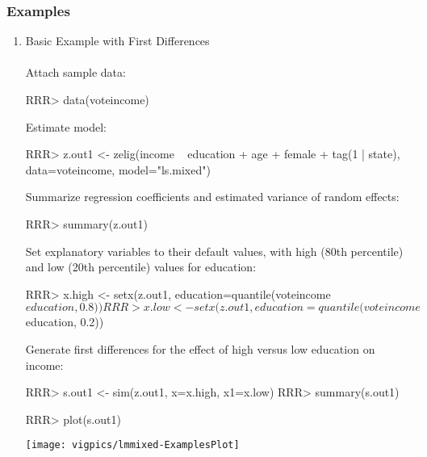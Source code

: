 \subsubsection{Examples}

\begin{enumerate}
\item Basic Example with First Differences \\
\\
Attach sample data: \\
\begin{Schunk}
\begin{Sinput}
RRR> data(voteincome)
\end{Sinput}
\end{Schunk}

Estimate model:

\begin{Schunk}
\begin{Sinput}
RRR> z.out1 <- zelig(income ~ education + age + female + tag(1 | state), data=voteincome, model="ls.mixed")
\end{Sinput}
\end{Schunk}

\noindent Summarize regression coefficients and estimated variance of random effects:\\
\begin{Schunk}
\begin{Sinput}
RRR> summary(z.out1)
\end{Sinput}
\end{Schunk}
Set explanatory variables to their default values, with high (80th percentile) and low (20th percentile) values for education:\\
\begin{Schunk}
\begin{Sinput}
RRR> x.high <- setx(z.out1, education=quantile(voteincome$education, 0.8))
RRR> x.low <- setx(z.out1, education=quantile(voteincome$education, 0.2))
\end{Sinput}
\end{Schunk}

Generate first differences for the effect of high versus low education on income: \\
\begin{Schunk}
\begin{Sinput}
RRR> s.out1 <- sim(z.out1, x=x.high, x1=x.low)
RRR> summary(s.out1)
\end{Sinput}
\end{Schunk}
\begin{center}
\begin{Schunk}
\begin{Sinput}
RRR> plot(s.out1)
\end{Sinput}
\end{Schunk}
\texttt{[image: vigpics/lmmixed-ExamplesPlot]}
\end{center}

\end{enumerate}

